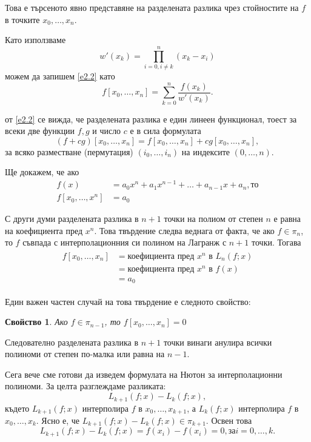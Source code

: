 \documentclass[12pt]{article}
\numberwithin{equation}{section}
\newtheorem{feature}{Свойство}
\numberwithin{theorem}{section}
\numberwithin{definition}{section}
\numberwithin{corollary}{section}
\begin{document}
Това е търсеното явно представяне на разделената разлика чрез стойностите на $f$ в точките $x_0, \dotso, x_n$.
\par
Като използваме
\[
w'(x_k) = \displaystyle\prod_{i=0, i\neq k}^n(x_k-x_i)
\]
можем да запишем \ref{e2.2} като
\[
f[x_0,\dotso, x_n] = \displaystyle\sum_{k=0}^n
                    \frac{f(x_k)}{w'(x_k)}.
\]
\par
от \ref{e2.2} се вижда, че разделената разлика е един линеен функционал, тоест за всеки две функции $f,g$ и число $c$ е в сила формулата
\[
(f+cg)[x_0,\dotso, x_n] = f[x_0, \dotso, x_n] + cg[x_0, \dotso, x_n],
\]
за всяко разместване (пермутация) $(i_0, \dotso, i_n)$ на индексите $(0,\dotso, n)$.
\par
Ще докажем, че ако
\begin{align*}
f(x) &= a_0x^n + a_1x^{n-1}+\dotso+a_{n-1}x+a_n, \text{то}\\
f[x_0,\dotso, x^n] &= a_0
\end{align*}
\par
С други думи разделената разлика в $n+1$ точки на полиом от степен $n$ е равна на коефициента пред $x^n$. Това твърдение следва веднага от факта, че ако $f\in \pi_n$, то $f$ съвпада с интерполационния си полином на Лагранж с $n+1$ точки. Тогава
\begin{align*}
\begin{split}
f[x_0, \dotso, x_n] &= \text{коефициента пред } x^n \text{ в } L_n(f;x)\\
                    &= \text{коефициента пред } x^n \text{ в } f(x)\\
                    &= a_0
\end{split}
\end{align*}
\par
Един важен частен случай на това твърдение е следното свойство:
\begin{feature}
Ако $f\in\pi_{n-1}$, то $f[x_0, \dotso, x_n] = 0$
\end{feature}
\par
Следователно разделената разлика в $n+1$ точки винаги анулира всички полиноми от степен по-малка или равна на $n-1$.
\par
Сега вече сме готови да изведем формулата на Нютон за интерполационни полиноми. За целта разглеждаме разликата:
\[
L_{k+1}(f;x) - L_k(f;x),
\]
където $L_{k+1}(f;x)$ интерполира $f$ в $x_0,\dotso,x_{k+1}$, а $L_k(f;x)$ интерполира $f$ в $x_0,\dotso, x_k$. Ясно е, че $L_{k+1}(f;x) - L_k(f;x)\in\pi_{k+1}$. Освен това
\[
L_{k+1}(f;x) - L_k(f;x) = f(x_i) - f(x_i) = 0, \text{за} i = 0,\dotso,k.
\]
\end{document}
